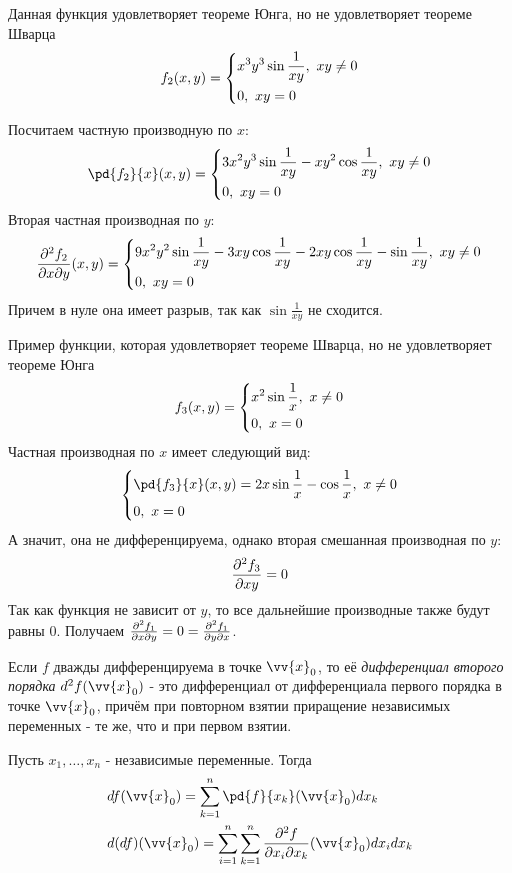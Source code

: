\begin{example}
	Данная функция удовлетворяет теореме Юнга, но не удовлетворяет теореме Шварца
	\[
		f_2(x, y) = \left\{\begin{aligned}
			&{x^3 y^3 \sin \frac{1}{xy},\ xy \neq 0}
			\\
			&{0,\ xy = 0}
		\end{aligned}\right.
	\]
	
	Посчитаем частную производную по $x$:
	\[
		\pd{f_2}{x}(x, y) = \System{
			&{3x^2y^3 \sin \frac{1}{xy} - xy^2 \cos \frac{1}{xy},\ xy \neq 0}
			\\
			&{0,\ xy = 0}
		}
	\]
	Вторая частная производная по $y$:
	\[
		\frac{\partial^2 f_2}{\partial x \partial y}(x, y) = \left\{\begin{aligned}
			&{9x^2y^2 \sin \frac{1}{xy} - 3xy\cos\frac{1}{xy} - 2xy\cos\frac{1}{xy} - \sin\frac{1}{xy},\ xy \neq 0}
			\\
			&{0,\ xy = 0}
		\end{aligned}\right.
	\]
	Причем в нуле она имеет разрыв, так как $\sin\frac{1}{xy}$ не сходится.
\end{example}

\begin{example}
	Пример функции, которая удовлетворяет теореме Шварца, но не удовлетворяет теореме Юнга
	\[
		f_3(x, y) = \left\{\begin{aligned}
			&{x^2 \sin \frac{1}{x},\ x \neq 0}
			\\
			&{0,\ x = 0}
		\end{aligned}\right.
	\]
	Частная производная по $x$ имеет следующий вид:
	\[
		\System{
			&{\pd{f_3}{x}(x, y) = 2x \sin \frac{1}{x} - \cos\frac{1}{x},\ x \neq 0}
			\\
			&{0,\ x = 0}
		}
	\]
	А значит, она не дифференцируема, однако вторая смешанная производная по $y$:
	\[
		\frac{\partial^2 f_3}{\partial xy} = 0
	\]
	Так как функция не зависит от $y$, то все дальнейшие производные также будут равны 0. Получаем $\frac{\partial^2 f_1}{\partial x \partial y} = 0 = \frac{\partial^2 f_1}{\partial y \partial x}$.
\end{example}

\begin{definition}
	Если $f$ дважды дифференцируема в точке $\vv{x}_0$, то её \textit{дифференциал второго порядка} $d^2 f(\vv{x}_0)$ - это дифференциал от дифференциала первого порядка в точке $\vv{x}_0$, причём при повторном взятии приращение независимых переменных - те же, что и при первом взятии.
\end{definition}

\begin{note}
	Пусть $x_1, \ldots, x_n$ - независимые переменные. Тогда
	\begin{align*}
		&{df(\vv{x}_0) = \suml_{k = 1}^n \pd{f}{x_k} (\vv{x}_0) dx_k}
		\\
		&{d(df)(\vv{x}_0) = \suml_{i = 1}^n \suml_{k = 1}^n \frac{\vdelta^2 f}{\vdelta x_i \vdelta x_k} (\vv{x}_0) dx_i dx_k}
	\end{align*}
\end{note}

